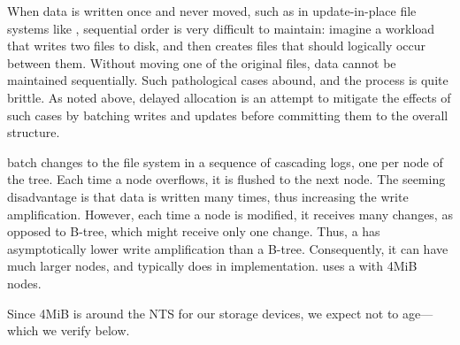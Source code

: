 When data is written once and never moved, such as in update-in-place file
systems like \ext, sequential order is very difficult to maintain: imagine a
workload that writes two files to disk, and then creates files that should
logically occur between them. Without moving one of the original files, data
cannot be maintained sequentially.  Such pathological cases abound, and the
process is quite brittle. As noted above, delayed allocation is an attempt to
mitigate the effects of such cases by batching writes and updates before
committing them to the overall structure. 




  \bets batch changes to the file system in a
sequence of cascading logs, one per node of the tree.  Each time a
node overflows, it is flushed to the next node.  The seeming
disadvantage is that data is written many times, thus increasing the
write amplification.  However, each time a node is modified, it
receives many changes, as opposed to B-tree, which might receive only
one change.  Thus, a \bet has asymptotically lower write amplification
than a B-tree.  Consequently, it can have much larger nodes, and
typically does in implementation.  \betrfs uses a \bet with 4MiB nodes.  

Since 4MiB is around the NTS for our storage devices,
we expect \betrfs not to age---which we verify below.

